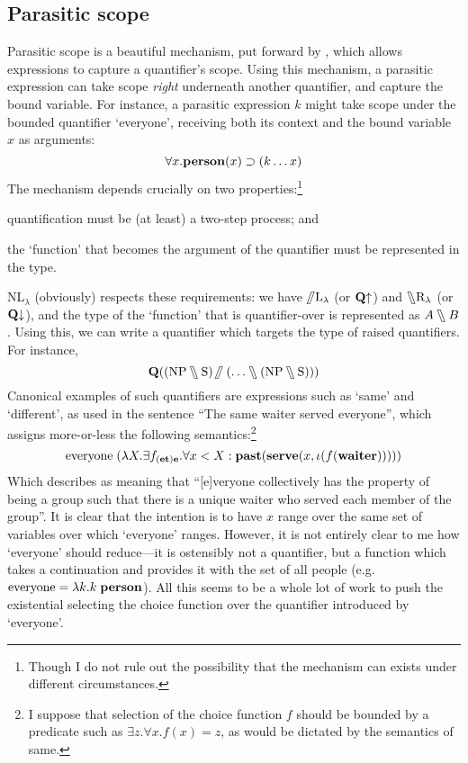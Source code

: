 \documentclass[a4paper]{article}
\begin{document}


\subsection{Parasitic scope}
Parasitic scope is a beautiful mechanism, put forward by
\citet{barker2007}, which allows expressions to capture a quantifier's
scope. Using this mechanism, a parasitic expression can take scope
\emph{right} underneath another quantifier, and capture the bound
variable. For instance, a parasitic expression $k$ might take scope
under the bounded quantifier `everyone', receiving both its context
and the bound variable $x$ as arguments:
\[
  \forall{x}.\PERSON(x)\supset(k\ldots{x})
\]
The mechanism depends crucially on two properties:\footnote{%
  Though I do not rule out the possibility that the mechanism can
  exists under different circumstances.
}
\begin{enumerate*}[label=(\arabic*)]
\item quantification must be (at least) a two-step process; and
\item the `function' that becomes the argument of the quantifier must
  be represented in the type.
\end{enumerate*}
NL$_\lambda$ (obviously) respects these requirements: we have
$\himpl\text{L}_\lambda$ (or $\qup$) and $\himpr\text{R}_\lambda$ (or
$\qdown$), and the type of the `function' that is quantifier-over is
represented as ${A}\himpr{B}$. Using this, we can write a quantifier
which targets the type of raised quantifiers. For instance,
\[
  \q[(\NP\himpr\S)\himpl(\ldots\himpr(\NP\himpr\S))]
\]
Canonical examples of such quantifiers are expressions such as `same'
and `different', as used in the sentence ``The same waiter served
everyone'', which \citet{barker2007} assigns more-or-less the
following semantics:\footnote{%
  I suppose that selection of the choice function $f$ should be
  bounded by a predicate such as $\exists{z}.\forall{x}.f(x)=z$, as
  would be dictated by the semantics of same.
}
\[
  \text{everyone}\;(\lambda{X}.\exists{f_{(\e\t)\e}}.\forall{x<X}:
  \PAST(\SERVE(x,\iota(f(\WAITER)))))
\]
Which \citeauthor{barker2007} describes as meaning that ``[e]veryone
collectively has the property of being a group such that there is a
unique waiter who served each member of the group''. It is clear that
the intention is to have $x$ range over the same set of variables over
which `everyone' ranges. However, it is not entirely clear to me how
`everyone' should reduce---it is ostensibly not a quantifier, but a
function which takes a continuation and provides it with the set of
all people (e.g.\ $\text{everyone}=\lambda{k}.k\;\PERSON$). All this
seems to be a whole lot of work to push the existential selecting the
choice function over the quantifier introduced by `everyone'.
\end{document}
